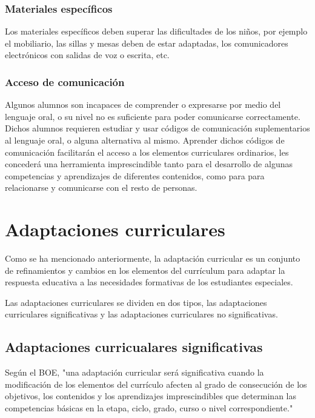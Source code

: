 \subsubsection{ Materiales específicos}
Los materiales específicos deben superar las dificultades de los niños, por ejemplo el mobiliario, las sillas y mesas deben de estar adaptadas, los comunicadores electrónicos con salidas de voz o escrita, etc.
\subsubsection{Acceso de comunicación}
Algunos alumnos son incapaces de comprender o expresarse por medio del lenguaje oral, o su nivel no es suficiente para poder comunicarse correctamente. Dichos alumnos requieren estudiar y usar códigos de comunicación suplementarios al lenguaje oral, o alguna alternativa al mismo. Aprender dichos códigos de comunicación facilitarán el acceso a los elementos curriculares ordinarios, les concederá una herramienta imprescindible tanto para el desarrollo de algunas competencias y aprendizajes de diferentes contenidos, como para para relacionarse y comunicarse con el resto de personas.

\section{Adaptaciones curriculares}
Como se ha mencionado anteriormente, la adaptación curricular es un conjunto de refinamientos y cambios en los elementos del currículum para adaptar la respuesta educativa a las necesidades formativas de los estudiantes especiales. 

Las adaptaciones curriculares se dividen en dos tipos, las adaptaciones curriculares significativas y las adaptaciones curriculares no significativas. 
\subsection{Adaptaciones curricualares significativas}
Según el BOE, "una adaptación curricular será significativa cuando la modificación de los elementos del currículo afecten al grado de consecución de los objetivos, los contenidos y los aprendizajes imprescindibles que determinan las competencias básicas en la etapa, ciclo, grado, curso o nivel correspondiente."

